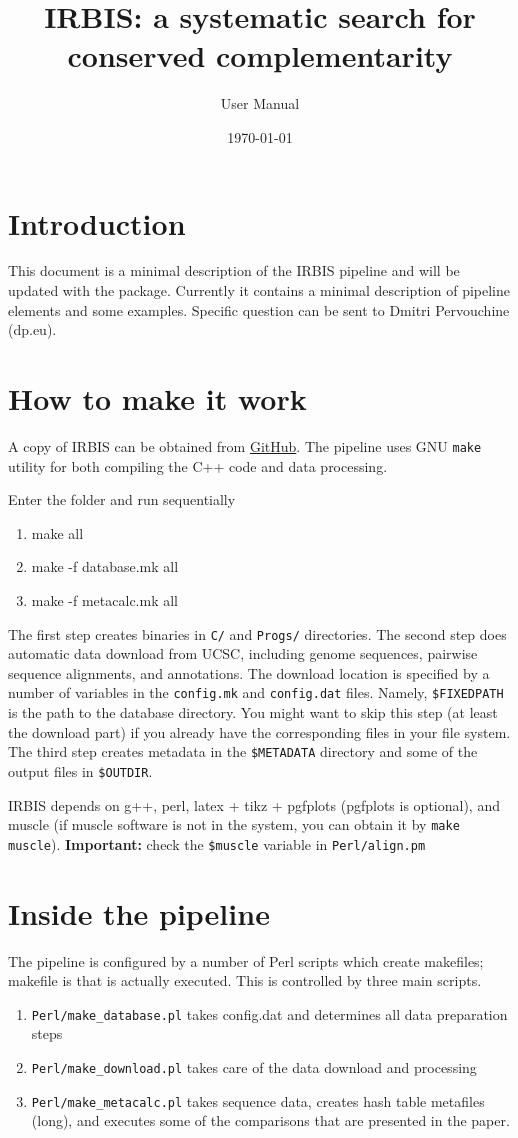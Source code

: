 \documentclass{article}
\title{IRBIS: a systematic search for conserved complementarity}
\author{\sc User Manual}
\date{\today}
\begin{document}
\maketitle
\tableofcontents
\section{Introduction}
This document is  a minimal description of the IRBIS pipeline and will be updated with the package. Currently it 
contains a minimal description of pipeline elements and some examples. Specific question can be sent to Dmitri 
Pervouchine (dp\@crg.eu).

\section{How to make it work}
A copy of IRBIS can be obtained from \href{https://github.com/pervouchine/irbis}{GitHub}. 
The pipeline uses GNU {\tt make} utility for both compiling the C++ code and data processing. 

Enter the folder and run sequentially
\begin{enumerate} 
\tt
\item make all
\item make -f database.mk all
\item make -f metacalc.mk all
\end{enumerate}

The first step creates binaries in {\tt C/} and {\tt Progs/} directories. The second step does automatic data download 
from UCSC, including genome sequences, pairwise sequence alignments, and annotations. The download location is specified 
by a number of variables in the {\tt config.mk} and {\tt config.dat} files. Namely, {\tt \$FIXEDPATH} is the path to the database directory. 
You might want to skip this step (at least the download part) if you already have the corresponding files in your file 
system. The third step creates metadata in the {\tt \$METADATA} directory and some of the output files in {\tt \$OUTDIR}.

IRBIS depends on g++, perl, latex + tikz + pgfplots (pgfplots is optional), and muscle (if muscle software is 
not in the system, you can obtain it by {\tt make muscle}). {\bf Important:} check the {\tt \$muscle} variable in {\tt Perl/align.pm}

\section{Inside the pipeline}
The pipeline is configured by a number of Perl scripts which create makefiles; makefile is that is actually executed. This is 
controlled by three main scripts.
\begin{enumerate}
\item {\tt Perl/make\_database.pl} takes config.dat and determines all data preparation steps
\item {\tt Perl/make\_download.pl} takes care of the data download and processing
\item {\tt Perl/make\_metacalc.pl} takes sequence data, creates hash table metafiles (long), and executes some of the comparisons 
that are presented in the paper.
\end{enumerate}
\end{document}
